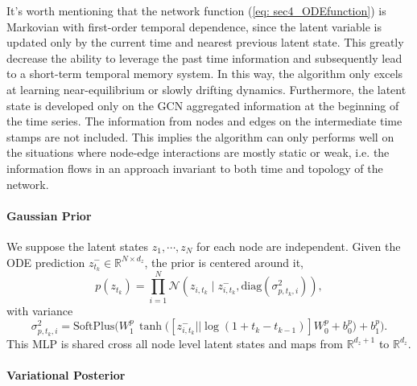 It's worth mentioning that the network function (\ref{eq: sec4_ODEfunction}) is Markovian with first-order temporal dependence, 
since the latent variable is updated only by the current time and nearest previous latent state. 
This greatly decrease the ability to leverage the past time information and subsequently lead to a short-term temporal memory system. 
In this way, the algorithm only excels at learning near-equilibrium or slowly drifting dynamics. 
Furthermore, the latent state is developed only on the GCN aggregated information at the beginning of the time series. 
The information from nodes and edges on the intermediate time stamps are not included. 
This implies the algorithm can only performs well on the situations where node-edge interactions are mostly static or weak, 
i.e. the information flows in an approach invariant to both time and topology of the network.

\paragraph{Gaussian Prior}

We suppose the latent states $z_1,\cdots,z_N$ for each node are independent. 
Given the ODE prediction $z_{t_k}^-\in\mathbb{R}^{N\times d_z}$, the prior is centered around it, 
\begin{equation*}
    p(z_{t_k}) = \prod_{i=1}^N \mathcal{N}(z_{i,t_k} \mid z_{i,t_k}^-, \mathrm{diag}(\sigma_{p,t_k,i}^2)),
\end{equation*}
with variance
\begin{equation*}
    \sigma^2_{p,t_k,i}= \mathrm{SoftPlus}\big(W_1^p\, \tanh\!\big( [z_{i,t_k}^-||\log(1+t_k-t_{k-1})]W_0^p  + b_0^p \big) + b_1^p\big).
\end{equation*}
This MLP is shared cross all node level latent states and maps from $\mathbb{R}^{d_z+1}$ to $\mathbb{R}^{d_z}$. 

\paragraph{Variational Posterior}

